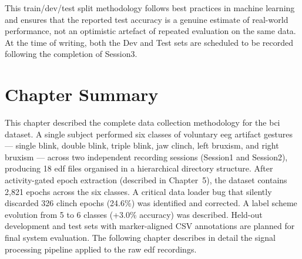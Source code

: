 This train/dev/test split methodology follows best practices
in machine learning~\cite{pedregosa2011sklearn} and ensures
that the reported test accuracy is a genuine estimate of
real-world performance, not an optimistic artefact of repeated
evaluation on the same data. At the time of writing, both the
Dev and Test sets are scheduled to be recorded following the
completion of Session3.

\section{Chapter Summary}
\label{sec:dc_summary}

This chapter described the complete data collection methodology
for the \acrshort{bci} dataset. A single subject performed six
classes of voluntary \acrshort{eeg} artifact gestures --- single
blink, double blink, triple blink, jaw clinch, left bruxism,
and right bruxism --- across two independent recording sessions
(Session1 and Session2), producing 18 \acrshort{edf} files
organised in a hierarchical directory structure. After
activity-gated epoch extraction (described in Chapter~5), the
dataset contains 2{,}821 epochs across the six classes. A
critical data loader bug that silently discarded 326 clinch
epochs (24.6\%) was identified and corrected. A label scheme
evolution from 5 to 6 classes (+3.0\% accuracy) was described.
Held-out development and test sets with marker-aligned CSV
annotations are planned for final system evaluation. The
following chapter describes in detail the signal processing
pipeline applied to the raw \acrshort{edf} recordings.